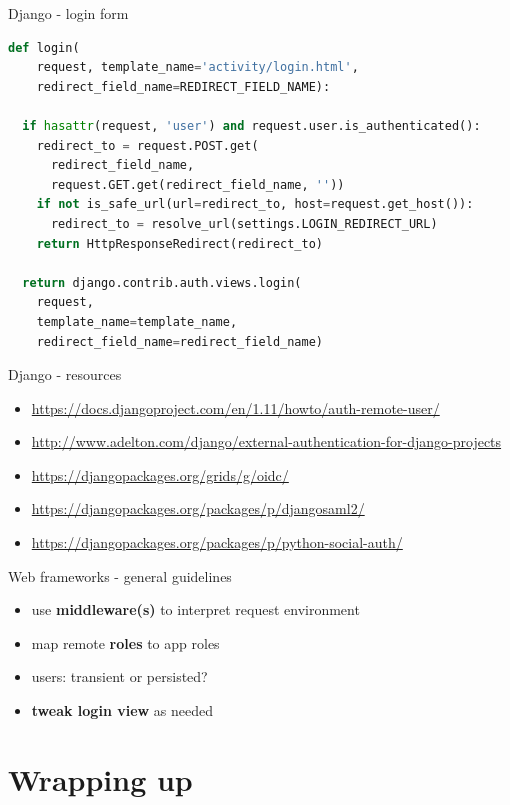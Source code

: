 \documentclass[ignorenonframetext,aspectratio=169]{beamer}
\providecommand{\tightlist}{%
  \setlength{\itemsep}{0pt}\setlength{\parskip}{0pt}}
\begin{document}
\begin{frame}[fragile]{Django - login form}
\begin{lstlisting}[language=Python]
def login(
    request, template_name='activity/login.html',
    redirect_field_name=REDIRECT_FIELD_NAME):

  if hasattr(request, 'user') and request.user.is_authenticated():
    redirect_to = request.POST.get(
      redirect_field_name,
      request.GET.get(redirect_field_name, ''))
    if not is_safe_url(url=redirect_to, host=request.get_host()):
      redirect_to = resolve_url(settings.LOGIN_REDIRECT_URL)
    return HttpResponseRedirect(redirect_to)

  return django.contrib.auth.views.login(
    request,
    template_name=template_name,
    redirect_field_name=redirect_field_name)
\end{lstlisting}
\end{frame}

\begin{frame}{Django - resources}
\begin{itemize}
\tightlist

\item \url{https://docs.djangoproject.com/en/1.11/howto/auth-remote-user/}
\item \url{http://www.adelton.com/django/external-authentication-for-django-projects}
\item \url{https://djangopackages.org/grids/g/oidc/}
\item \url{https://djangopackages.org/packages/p/djangosaml2/}
\item \url{https://djangopackages.org/packages/p/python-social-auth/}

\end{itemize}
\end{frame}

\begin{frame}{Web frameworks - general guidelines}
\begin{itemize}
\tightlist
\item use {\bf middleware(s)} to interpret request environment
\item map remote {\bf roles} to app roles
\item users: transient or persisted?
\item {\bf tweak login view} as needed
\end{itemize}
\end{frame}

\section{Wrapping up}
\end{document}

